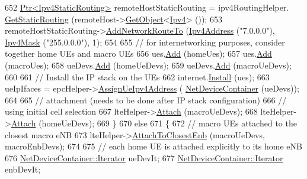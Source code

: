 \begin{DoxyCode}
652       \hyperlink{classns3_1_1Ptr}{Ptr<Ipv4StaticRouting>} remoteHostStaticRouting = ipv4RoutingHelper.
      \hyperlink{classns3_1_1Ipv4StaticRoutingHelper_a731206e50d305695dac7fb2ef963a4bb}{GetStaticRouting} (remoteHost->\hyperlink{classns3_1_1Object_a13e18c00017096c8381eb651d5bd0783}{GetObject}<\hyperlink{classns3_1_1Ipv4}{Ipv4}> ());
653       remoteHostStaticRouting->\hyperlink{classns3_1_1Ipv4StaticRouting_a8bf5eaa7ba49fe33c78c70d5560b6c39}{AddNetworkRouteTo} (\hyperlink{classns3_1_1Ipv4Address}{Ipv4Address} (\textcolor{stringliteral}{"7.0.0.0"}), 
      \hyperlink{classns3_1_1Ipv4Mask}{Ipv4Mask} (\textcolor{stringliteral}{"255.0.0.0"}), 1);
654 
655       \textcolor{comment}{// for internetworking purposes, consider together home UEs and macro UEs}
656       ues.\hyperlink{classns3_1_1NodeContainer_aa60b3a0e70f2fb324e16ffcf8bf31fcb}{Add} (homeUes);
657       ues.\hyperlink{classns3_1_1NodeContainer_aa60b3a0e70f2fb324e16ffcf8bf31fcb}{Add} (macroUes);
658       ueDevs.\hyperlink{classns3_1_1NetDeviceContainer_a7ca8bc1d7ec00fd4fcc63869987fbda5}{Add} (homeUeDevs);
659       ueDevs.\hyperlink{classns3_1_1NetDeviceContainer_a7ca8bc1d7ec00fd4fcc63869987fbda5}{Add} (macroUeDevs);
660 
661       \textcolor{comment}{// Install the IP stack on the UEs}
662       internet.\hyperlink{classns3_1_1InternetStackHelper_a6645b412f31283d2d9bc3d8a95cebbc0}{Install} (ues);
663       ueIpIfaces = epcHelper->\hyperlink{classns3_1_1PointToPointEpcHelper_a11102d32127163fdcc47c44623d4f0cc}{AssignUeIpv4Address} (
      \hyperlink{classns3_1_1NetDeviceContainer}{NetDeviceContainer} (ueDevs));
664 
665       \textcolor{comment}{// attachment (needs to be done after IP stack configuration)}
666       \textcolor{comment}{// using initial cell selection}
667       lteHelper->\hyperlink{classns3_1_1LteHelper_a9466743f826aa2652a87907b7f0a1c87}{Attach} (macroUeDevs);
668       lteHelper->\hyperlink{classns3_1_1LteHelper_a9466743f826aa2652a87907b7f0a1c87}{Attach} (homeUeDevs);
669     \}
670   \textcolor{keywordflow}{else}
671     \{
672       \textcolor{comment}{// macro UEs attached to the closest macro eNB}
673       lteHelper->\hyperlink{classns3_1_1LteHelper_af1e68c53f22b705f1c41753558240999}{AttachToClosestEnb} (macroUeDevs, macroEnbDevs);
674 
675       \textcolor{comment}{// each home UE is attached explicitly to its home eNB}
676       \hyperlink{classns3_1_1NetDeviceContainer_a45709bb572f975569ed985fa89b132f8}{NetDeviceContainer::Iterator} ueDevIt;
677       \hyperlink{classns3_1_1NetDeviceContainer_a45709bb572f975569ed985fa89b132f8}{NetDeviceContainer::Iterator} enbDevIt;

\end{DoxyCode}
